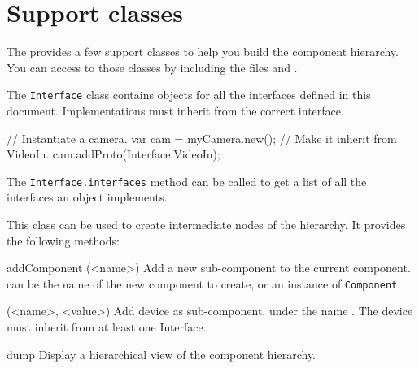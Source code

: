 \section{Support classes}
The \usdk provides a few support \us classes to help you build the component
hierarchy.  You can access to those classes by including the files
 and .

{
\let\subsection\subsectionObject

\subsection{Interface}

The \lstinline{Interface} class contains \us objects for all the interfaces
defined in this document. Implementations must inherit from the correct
interface.

\begin{urbiunchecked}
// Instantiate a camera.
var cam = myCamera.new();
// Make it inherit from VideoIn.
cam.addProto(Interface.VideoIn);
\end{urbiunchecked}

The \lstinline{Interface.interfaces} method can be called to get a list of
all the interfaces an object implements.

\subsection{Component}

This class can be used to create intermediate nodes of the hierarchy. It
provides the following methods:

\begin{urbiscriptapi}
\item[addComponent](<name>)%
  Add a new sub-component to the current component.  can
  be the name of the new component to create, or an instance of
  \lstinline{Component}.


\item[addDevice](<name>, <value>)%
  Add device  as sub-component, under the name . The
  device must inherit from at least one Interface.


\item[dump]%
  Display a hierarchical view of the component hierarchy.



\end{urbiscriptapi}}
